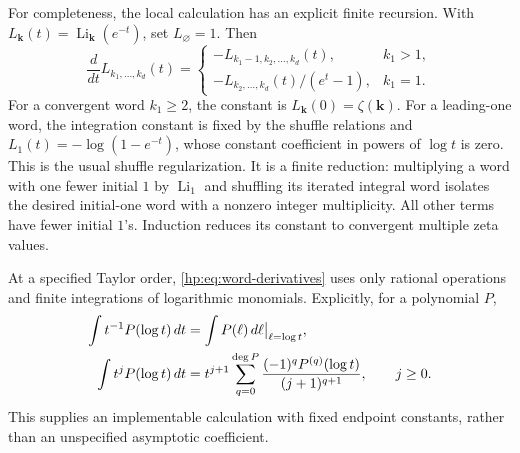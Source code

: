 For completeness, the local calculation has an explicit finite
recursion. With $L_{\boldsymbol{k}}(t)=
\operatorname{Li}_{\boldsymbol{k}}(e^{-t})$, set $L_{\varnothing}=1$.
Then
\begin{equation}\label{hp:eq:word-derivatives}
 \frac{d}{dt}L_{k_1,\ldots,k_d}(t)=
 \begin{cases}
  -L_{k_1-1,k_2,\ldots,k_d}(t),& k_1>1,\\
  -L_{k_2,\ldots,k_d}(t)/(e^t-1),& k_1=1.
 \end{cases}
\end{equation}
For a convergent word $k_1\ge2$, the constant is
$L_{\boldsymbol{k}}(0)=\zeta(\boldsymbol{k})$.
For a leading-one word, the integration constant is fixed by the
shuffle relations and $L_1(t)=-\log(1-e^{-t})$, whose constant
coefficient in powers of $\log t$ is zero. This is the usual shuffle
regularization. It is a finite reduction: multiplying a word with one
fewer initial $1$ by $\operatorname{Li}_1$ and shuffling its iterated
integral word isolates the desired initial-one word with a nonzero
integer multiplicity. All other terms have fewer initial $1$'s.
Induction reduces its constant to convergent multiple zeta values.

At a specified Taylor order, \eqref{hp:eq:word-derivatives} uses only
rational operations and finite integrations of logarithmic monomials.
Explicitly, for a polynomial $P$,
\begin{align}
 \int t^{-1}P(\log t)\,dt
   &=\int P(\ell)\,d\ell\big|_{\ell=\log t},\notag\\
 \int t^jP(\log t)\,dt
   &=t^{j+1}\sum_{q=0}^{\deg P}
           \frac{(-1)^qP^{(q)}(\log t)}{(j+1)^{q+1}},
                       \qquad j\ge0.\label{hp:eq:finite-integration}
\end{align}
This supplies an implementable calculation with fixed endpoint
constants, rather than an unspecified asymptotic coefficient.

